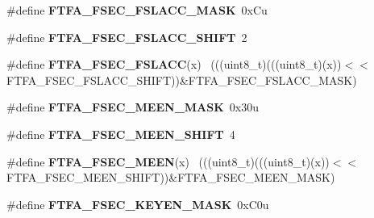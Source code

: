 \begin{DoxyCompactItemize}
\item 
\hypertarget{group___f_t_f_a___register___masks_gac14ea09f287d879b663b0a592c330ec0}{}\#define {\bfseries F\+T\+F\+A\+\_\+\+F\+S\+E\+C\+\_\+\+F\+S\+L\+A\+C\+C\+\_\+\+M\+A\+S\+K}~0x\+Cu\label{group___f_t_f_a___register___masks_gac14ea09f287d879b663b0a592c330ec0}

\item 
\hypertarget{group___f_t_f_a___register___masks_ga1cb7f2755cb290524e1dbb662893582c}{}\#define {\bfseries F\+T\+F\+A\+\_\+\+F\+S\+E\+C\+\_\+\+F\+S\+L\+A\+C\+C\+\_\+\+S\+H\+I\+F\+T}~2\label{group___f_t_f_a___register___masks_ga1cb7f2755cb290524e1dbb662893582c}

\item 
\hypertarget{group___f_t_f_a___register___masks_ga71edbaec032fe8f051a05ef5091a8ac4}{}\#define {\bfseries F\+T\+F\+A\+\_\+\+F\+S\+E\+C\+\_\+\+F\+S\+L\+A\+C\+C}(x)                                        ~(((uint8\+\_\+t)(((uint8\+\_\+t)(x))$<$$<$F\+T\+F\+A\+\_\+\+F\+S\+E\+C\+\_\+\+F\+S\+L\+A\+C\+C\+\_\+\+S\+H\+I\+F\+T))\&F\+T\+F\+A\+\_\+\+F\+S\+E\+C\+\_\+\+F\+S\+L\+A\+C\+C\+\_\+\+M\+A\+S\+K)\label{group___f_t_f_a___register___masks_ga71edbaec032fe8f051a05ef5091a8ac4}

\item 
\hypertarget{group___f_t_f_a___register___masks_gacb199d6a808af296edd3b6ec6ac66cb8}{}\#define {\bfseries F\+T\+F\+A\+\_\+\+F\+S\+E\+C\+\_\+\+M\+E\+E\+N\+\_\+\+M\+A\+S\+K}~0x30u\label{group___f_t_f_a___register___masks_gacb199d6a808af296edd3b6ec6ac66cb8}

\item 
\hypertarget{group___f_t_f_a___register___masks_gab4ae1ea1634e962a9b420433b1d02e81}{}\#define {\bfseries F\+T\+F\+A\+\_\+\+F\+S\+E\+C\+\_\+\+M\+E\+E\+N\+\_\+\+S\+H\+I\+F\+T}~4\label{group___f_t_f_a___register___masks_gab4ae1ea1634e962a9b420433b1d02e81}

\item 
\hypertarget{group___f_t_f_a___register___masks_gaceb5a7cafe5eb8ffced5fbd0031297c2}{}\#define {\bfseries F\+T\+F\+A\+\_\+\+F\+S\+E\+C\+\_\+\+M\+E\+E\+N}(x)                                            ~(((uint8\+\_\+t)(((uint8\+\_\+t)(x))$<$$<$F\+T\+F\+A\+\_\+\+F\+S\+E\+C\+\_\+\+M\+E\+E\+N\+\_\+\+S\+H\+I\+F\+T))\&F\+T\+F\+A\+\_\+\+F\+S\+E\+C\+\_\+\+M\+E\+E\+N\+\_\+\+M\+A\+S\+K)\label{group___f_t_f_a___register___masks_gaceb5a7cafe5eb8ffced5fbd0031297c2}

\item 
\hypertarget{group___f_t_f_a___register___masks_ga6c9887828940e3a922c4b93037557df2}{}\#define {\bfseries F\+T\+F\+A\+\_\+\+F\+S\+E\+C\+\_\+\+K\+E\+Y\+E\+N\+\_\+\+M\+A\+S\+K}~0x\+C0u\label{group___f_t_f_a___register___masks_ga6c9887828940e3a922c4b93037557df2}


\end{DoxyCompactItemize}
